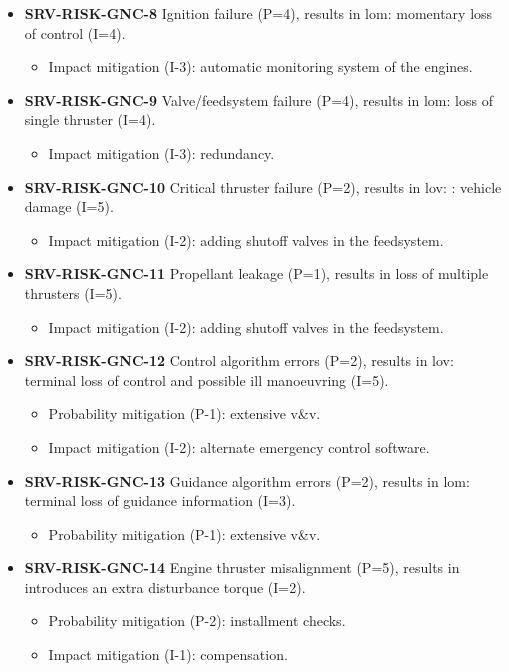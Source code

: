 \begin{itemize}
	 \item \textbf{SRV-RISK-GNC-8} Ignition failure (P=4), results in lom: momentary loss of control (I=4).
	\begin{itemize}
		 \item Impact mitigation (I-3):  automatic monitoring system of the engines.	\end{itemize}
	 \item \textbf{SRV-RISK-GNC-9} Valve/feedsystem failure (P=4), results in lom: loss of single thruster (I=4).
	\begin{itemize}
		 \item Impact mitigation (I-3):  redundancy.	\end{itemize}
	 \item \textbf{SRV-RISK-GNC-10} Critical thruster failure (P=2), results in lov: : vehicle damage (I=5).
	\begin{itemize}
		 \item Impact mitigation (I-2):  adding shutoff valves in the feedsystem.	\end{itemize}
	 \item \textbf{SRV-RISK-GNC-11} Propellant leakage (P=1), results in loss of multiple thrusters (I=5).
	\begin{itemize}
		 \item Impact mitigation (I-2):  adding shutoff valves in the feedsystem.	\end{itemize}
	 \item \textbf{SRV-RISK-GNC-12} Control algorithm errors (P=2), results in lov: terminal loss of control and possible ill manoeuvring (I=5).
	\begin{itemize}
		 \item Probability mitigation (P-1):  extensive v\&v.		 \item Impact mitigation (I-2):  alternate emergency control software.	\end{itemize}
	 \item \textbf{SRV-RISK-GNC-13} Guidance algorithm errors (P=2), results in lom: terminal loss of guidance information (I=3).
	\begin{itemize}
		 \item Probability mitigation (P-1):  extensive v\&v.	\end{itemize}
	 \item \textbf{SRV-RISK-GNC-14} Engine thruster misalignment (P=5), results in introduces an extra disturbance torque (I=2).
	\begin{itemize}
		 \item Probability mitigation (P-2):  installment checks.		 \item Impact mitigation (I-1):  compensation.	\end{itemize}
\end{itemize}

